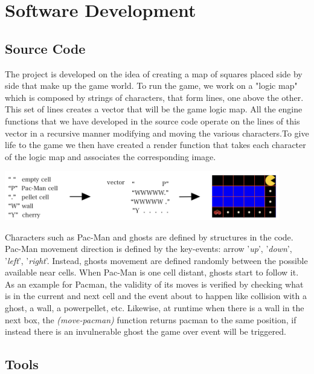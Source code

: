 \documentclass{article}
\begin{document}
\section{Software Development}

\subsection{Source Code}
The project is developed on the idea of creating a map of squares placed side by side that make up the game world. To run the game, we work on a "logic map" which is composed by strings of characters, that form lines, one above the other. This set of lines creates a vector that will be the game logic map. All the engine functions that we have developed in the source code operate on the lines of this vector in a recursive manner modifying and moving the various characters.To give life to the game we then have created a render function that takes each character of the logic map and associates the corresponding image.\\
 
\begin{center}
 \includegraphics[width=12cm]{./images/vector.jpeg}
\end{center}

Characters such as Pac-Man and ghosts are defined by structures in the code. Pac-Man movement direction is defined by the key-events: arrow '\textit{up}', '\textit{down}', '\textit{left}', '\textit{right}'.
Instead, ghosts movement are defined randomly between the possible available near cells. When Pac-Man is one cell distant, ghosts start to follow it.
As an example for Pacman, the validity of its moves is verified by checking what is in the current and next cell and the event about to happen like collision with a ghost, a wall, a powerpellet, etc. Likewise, at runtime when there is a wall in the next box, the \textit{(move-pacman)} function returns pacman to the same position, if instead there is an invulnerable ghost the game over event will be triggered.
 
\subsection{Tools}
 
\end{document}
